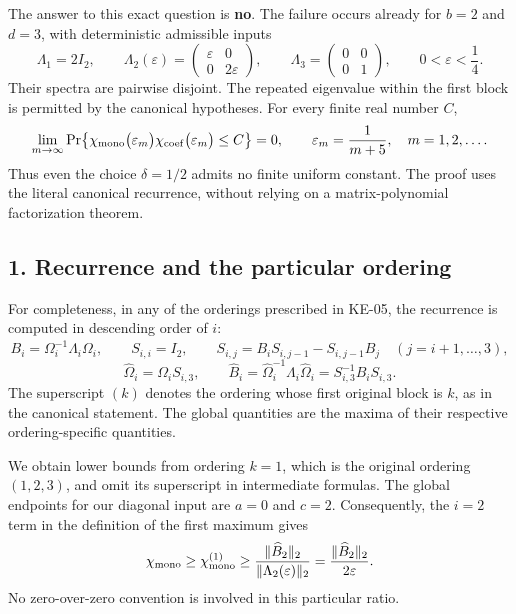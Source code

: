 \documentclass[10pt,a4paper]{article}
\begin{document}
The answer to this exact question is \textbf{no}. The failure occurs already for \(b=2\) and \(d=3\), with deterministic admissible inputs \nopagebreak[3]
\[
\Lambda_1=2I_2,\qquad
\Lambda_2(\varepsilon)=
\begin{pmatrix}\varepsilon&0\\0&2\varepsilon\end{pmatrix},
\qquad
\Lambda_3=
\begin{pmatrix}0&0\\0&1\end{pmatrix},
\qquad 0<\varepsilon<\frac14.
\] Their spectra are pairwise disjoint. The repeated eigenvalue within the first block is permitted by the canonical hypotheses. For every finite real number \(C\), \nopagebreak[3]
\[
\lim_{m\to\infty}
\Pr\!\left\{
\chi_{\rm mono}\bigl(\varepsilon_m\bigr)
\chi_{\rm coef}\bigl(\varepsilon_m\bigr)\leq C
\right\}=0,
\qquad
\varepsilon_m=\frac1{m+5},\quad m=1,2,\ldots.
\] Thus even the choice \(\delta=1/2\) admits no finite uniform constant. The proof uses the literal canonical recurrence, without relying on a matrix-polynomial factorization theorem.

\subsection{1. Recurrence and the particular ordering}\label{recurrence-and-the-particular-ordering}

For completeness, in any of the orderings prescribed in KE-05, the recurrence is computed in descending order of \(i\): \nopagebreak[3]
\[
B_i=\Omega_i^{-1}\Lambda_i\Omega_i,\qquad
S_{i,i}=I_2,\qquad
S_{i,j}=B_iS_{i,j-1}-S_{i,j-1}\widehat B_j
\quad(j=i+1,\ldots,3),
\] \nopagebreak[3]
\[
\widehat\Omega_i=\Omega_i S_{i,3},\qquad
\widehat B_i=\widehat\Omega_i^{-1}\Lambda_i\widehat\Omega_i
              =S_{i,3}^{-1}B_iS_{i,3}.
\] The superscript \((k)\) denotes the ordering whose first original block is \(k\), as in the canonical statement. The global quantities are the maxima of their respective ordering-specific quantities.

We obtain lower bounds from ordering \(k=1\), which is the original ordering \((1,2,3)\), and omit its superscript in intermediate formulas. The global endpoints for our diagonal input are \(a=0\) and \(c=2\). Consequently, the \(i=2\) term in the definition of the first maximum gives \nopagebreak[3]
\[
\chi_{\rm mono}\geq\chi_{\rm mono}^{(1)}
\geq
\frac{\|\widehat B_2\|_2}{\|\Lambda_2(\varepsilon)\|_2}
=\frac{\|\widehat B_2\|_2}{2\varepsilon}.
\] No zero-over-zero convention is involved in this particular ratio.
\end{document}
